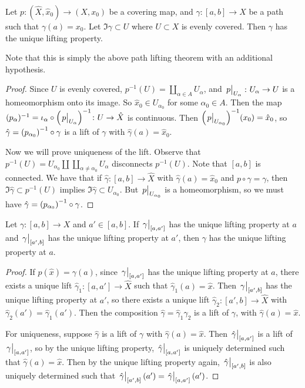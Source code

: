 \begin{lemma}
	Let \( p \colon (\hat X, \hat x_0) \to (X, x_0) \) be a covering map, and \( \gamma \colon [a,b] \to X \) be a path such that \( \gamma(a) = x_0 \).
	Let \( \Im \gamma \subset U \) where \( U \subset X \) is evenly covered.
	Then \( \gamma \) has the unique lifting property.
\end{lemma}
Note that this is simply the above path lifting theorem with an additional hypothesis.
\begin{proof}
	Since \( U \) is evenly covered, \( p^{-1}(U) = \coprod_{\alpha \in A} U_\alpha \), and \( \eval{p}_{U_\alpha} \colon U_\alpha \to U \) is a homeomorphism onto its image.
	So \( \hat x_0 \in U_{\alpha_0} \) for some \( \alpha_0 \in A \).
	Then the map \( (p_\alpha)^{-1} = \iota_\alpha \circ \qty(\eval{p}_{U_\alpha})^{-1} \colon U \to \hat X \) is continuous.
	Then \( \qty(\eval{p}_{U_{\alpha_0}})^{-1}(x_0) = \hat x_0 \), so \( \hat \gamma = \qty(p_{\alpha_0})^{-1} \circ \gamma \) is a lift of \( \gamma \) with \( \hat\gamma(a) = \hat x_0 \).

	Now we will prove uniqueness of the lift.
	Observe that \( p^{-1}(U) = U_{\alpha_0} \amalg \coprod_{\alpha \neq \alpha_0} U_\alpha \) disconnects \( p^{-1}(U) \).
	Note that \( [a,b] \) is connected.
	We have that if \( \hat\gamma \colon[a,b] \to \hat X \) with \( \hat \gamma(a) = \hat x_0 \) and \( p \circ \hat\gamma = \gamma \), then \( \Im \hat\gamma \subset p^{-1}(U) \) implies \( \Im \hat\gamma \subset U_{\alpha_0} \).
	But \( \eval{p}_{U_{\alpha_0}} \) is a homeomorphism, so we must have \( \hat \gamma = \qty(p_{\alpha_0})^{-1} \circ \gamma \).
\end{proof}
\begin{lemma}
	Let \( \gamma \colon [a,b] \to X \) and \( a' \in [a,b] \).
	If \( \eval{\gamma}_{[a,a']} \) has the unique lifting property at \( a \) and \( \eval{\gamma}_{[a',b]} \) has the unique lifting property at \( a' \), then \( \gamma \) has the unique lifting property at \( a \).
\end{lemma}
\begin{proof}
	If \( p(\hat x) = \gamma(a) \), since \( \eval{\gamma}_{[a,a']} \) has the unique lifting property at \( a \), there exists a unique lift \( \hat\gamma_1 : [a,a'] \to \hat X \) such that \( \hat\gamma_1(a) = \hat x \).
	Then \( \eval{\gamma}_{[a',b]} \) has the unique lifting property at \( a' \), so there exists a unique lift \( \hat\gamma_2 \colon [a',b] \to \hat X \) with \( \hat\gamma_2(a') = \hat\gamma_1(a') \).
	Then the composition \( \hat\gamma=\hat\gamma_1\hat\gamma_2 \) is a lift of \( \gamma \), with \( \hat\gamma(a) = \hat x \).

	For uniqueness, suppose \( \hat\gamma \) is a lift of \( \gamma \) with \( \hat\gamma(a) = \hat x \).
	Then \( \eval{\hat\gamma}_{[a,a']} \) is a lift of \( \eval{\gamma}_{[a,a']} \), so by the unique lifting property, \( \eval{\hat\gamma}_{[a,a']} \) is uniquely determined such that \( \hat\gamma(a) = \hat x \).
	Then by the unique lifting property again, \( \eval{\hat\gamma}_{[a',b]} \) is also uniquely determined such that \( \eval{\hat\gamma}_{[a',b]}(a') = \eval{\hat\gamma}_{[a,a']}(a') \).
\end{proof}
